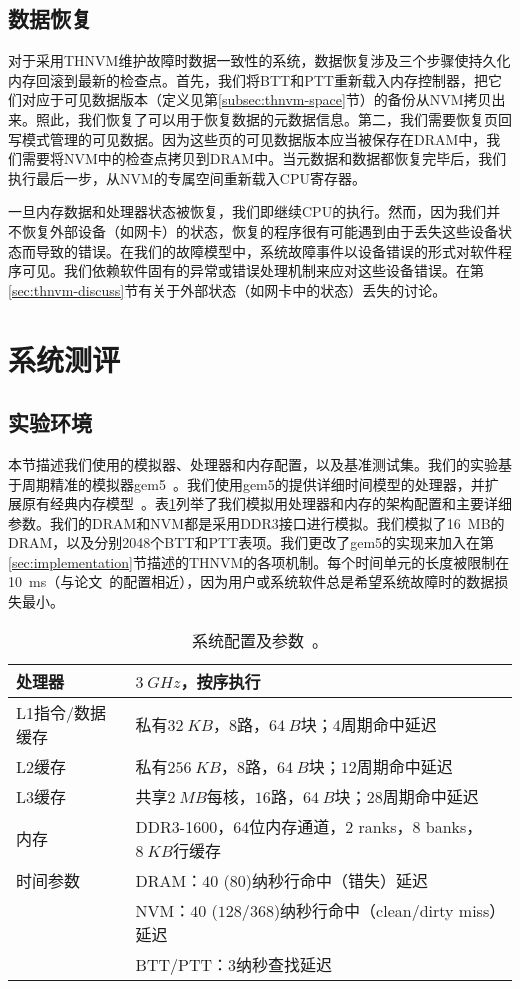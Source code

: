 \subsection{数据恢复} 
对于采用THNVM维护故障时数据一致性的系统，数据恢复涉及三个步骤使持久化内存回滚到最新的检查点。首先，我们将BTT和PTT重新载入内存控制器，把它们对应于可见数据版本（定义见第\ref{subsec:thnvm-space}节）的备份从NVM拷贝出来。照此，我们恢复了可以用于恢复数据的元数据信息。第二，我们需要恢复页回写模式管理的可见数据。因为这些页的可见数据版本应当被保存在DRAM中，我们需要将NVM中的检查点拷贝到DRAM中。当元数据和数据都恢复完毕后，我们执行最后一步，从NVM的专属空间重新载入CPU寄存器。 

一旦内存数据和处理器状态被恢复，我们即继续CPU的执行。然而，因为我们并不恢复外部设备（如网卡）的状态，恢复的程序很有可能遇到由于丢失这些设备状态而导致的错误。在我们的故障模型中，系统故障事件以设备错误的形式对软件程序可见。我们依赖软件固有的异常或错误处理机制来应对这些设备错误。在第\ref{sec:thnvm-discuss}节有关于外部状态（如网卡中的状态）丢失的讨论。 

\section{系统测评}
\label{sec:thnvm-eval}

\subsection{实验环境}

本节描述我们使用的模拟器、处理器和内存配置，以及基准测试集。我们的实验基于周期精准的模拟器gem5~\cite{Binkert:2011:GS:2024716.2024718}。我们使用gem5的提供详细时间模型的处理器，并扩展原有经典内存模型~\cite{6844484}。表\ref{table:config}列举了我们模拟用处理器和内存的架构配置和主要详细参数。我们的DRAM和NVM都是采用DDR3接口进行模拟。我们模拟了16~MB的DRAM，以及分别2048个BTT和PTT表项。我们更改了gem5的实现来加入在第\ref{sec:implementation}节描述的THNVM的各项机制。每个时间单元的长度被限制在10~ms（与论文~\cite{1003567, 1003568}的配置相近），因为用户或系统软件总是希望系统故障时的数据损失最小。 

\begin{table}[!h]
\centering
\caption{系统配置及参数~\cite{Lee:2009:APC:1555754.1555758}。}
\label{table:config}
\begin{tabular}{l|l}
\toprule[1.5pt]
处理器 & $3~GHz$，按序执行 \\
\hline
L1指令/数据缓存 & 私有$32~KB$，$8$路，$64~B$块；$4$周期命中延迟 \\
L2缓存 & 私有$256~KB$，$8$路，$64~B$块；$12$周期命中延迟 \\
L3缓存 & 共享$2~MB$每核，$16$路，$64~B$块；$28$周期命中延迟 \\
\hline
内存 & DDR3-1600，$64$位内存通道，$2$ ranks，$8$ banks，$8~KB$行缓存 \\
时间参数 & DRAM：$40$ ($80$)纳秒行命中（错失）延迟 \\
               & NVM：$40$ ($128$/$368$)纳秒行命中（clean/dirty miss）延迟 \\
               & BTT/PTT：$3$纳秒查找延迟 \\
\toprule[1.5pt]
\end{tabular}
\end{table}

